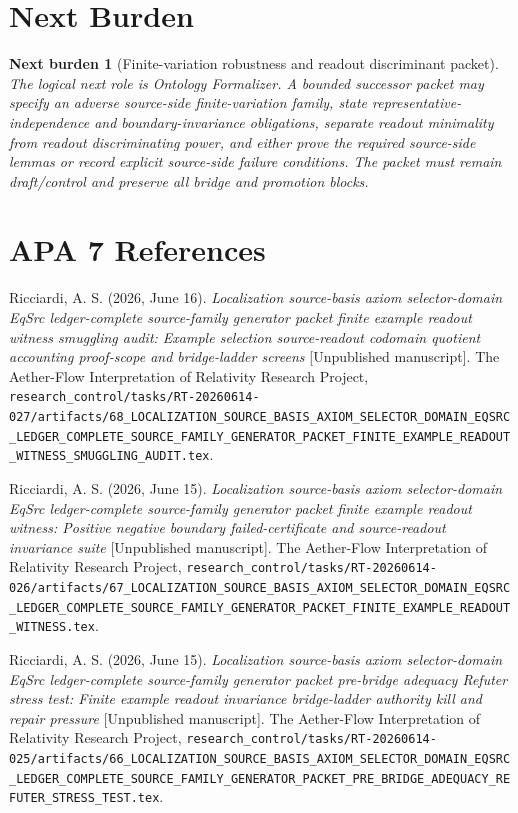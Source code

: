 \documentclass[11pt]{article}
\newtheorem{nextburden}{Next burden}
\begin{document}
\section{Next Burden}

\begin{nextburden}[Finite-variation robustness and readout discriminant packet]
The logical next role is Ontology Formalizer. A bounded successor
packet may specify an adverse source-side finite-variation family,
state representative-independence and boundary-invariance obligations,
separate readout minimality from readout discriminating power, and
either prove the required source-side lemmas or record explicit
source-side failure conditions. The packet must remain draft/control
and preserve all bridge and promotion blocks.
\end{nextburden}

\section*{APA 7 References}

Ricciardi, A. S. (2026, June 16). \emph{Localization source-basis axiom
selector-domain EqSrc ledger-complete source-family generator packet
finite example readout witness smuggling audit: Example selection
source-readout codomain quotient accounting proof-scope and
bridge-ladder screens} [Unpublished manuscript]. The Aether-Flow
Interpretation of Relativity Research Project,
\texttt{research\_control/tasks/RT-20260614-027/artifacts/68\_LOCALIZATION\_SOURCE\_BASIS\_AXIOM\_SELECTOR\_DOMAIN\_EQSRC\_LEDGER\_COMPLETE\_SOURCE\_FAMILY\_GENERATOR\_PACKET\_FINITE\_EXAMPLE\_READOUT\_WITNESS\_SMUGGLING\_AUDIT.tex}.

Ricciardi, A. S. (2026, June 15). \emph{Localization source-basis axiom
selector-domain EqSrc ledger-complete source-family generator packet
finite example readout witness: Positive negative boundary
failed-certificate and source-readout invariance suite} [Unpublished
manuscript]. The Aether-Flow Interpretation of Relativity Research
Project,
\texttt{research\_control/tasks/RT-20260614-026/artifacts/67\_LOCALIZATION\_SOURCE\_BASIS\_AXIOM\_SELECTOR\_DOMAIN\_EQSRC\_LEDGER\_COMPLETE\_SOURCE\_FAMILY\_GENERATOR\_PACKET\_FINITE\_EXAMPLE\_READOUT\_WITNESS.tex}.

Ricciardi, A. S. (2026, June 15). \emph{Localization source-basis axiom
selector-domain EqSrc ledger-complete source-family generator packet
pre-bridge adequacy Refuter stress test: Finite example readout
invariance bridge-ladder authority kill and repair pressure}
[Unpublished manuscript]. The Aether-Flow Interpretation of Relativity
Research Project,
\texttt{research\_control/tasks/RT-20260614-025/artifacts/66\_LOCALIZATION\_SOURCE\_BASIS\_AXIOM\_SELECTOR\_DOMAIN\_EQSRC\_LEDGER\_COMPLETE\_SOURCE\_FAMILY\_GENERATOR\_PACKET\_PRE\_BRIDGE\_ADEQUACY\_REFUTER\_STRESS\_TEST.tex}.
\end{document}
